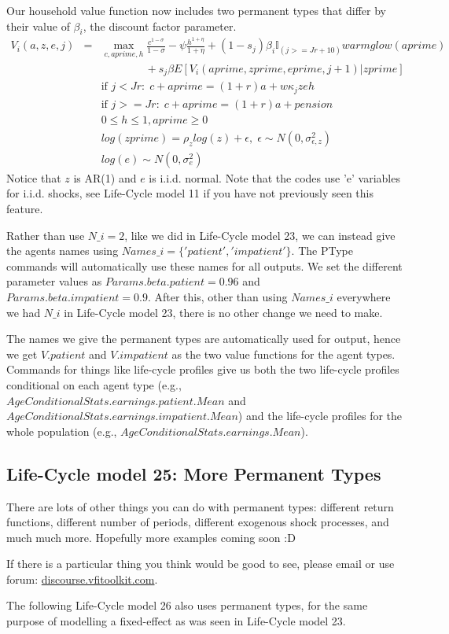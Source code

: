 Our household value function now includes two permanent types that differ by their value of $\beta_i$, the discount factor parameter.
\begin{eqnarray*}
 V_i(a,z,e,j)&=& \max_{c,aprime,h} \frac{c^{1-\sigma}}{1-\sigma} - \psi \frac{h^{1+\eta}}{1+\eta} + (1-s_j)\beta_i  \mathbb{I}_{(j>=Jr+10)} warmglow(aprime)     \\
 && \quad \quad  \quad \quad + s_j \beta E[V_i(aprime,zprime,eprime,j+1)|zprime] \\
&& \text{if }j<Jr: \; c+aprime=(1+r)a+w \kappa_j z e h \\
&& \text{if }j>=Jr: \; c+aprime=(1+r)a +pension\\
&& 0\leq h \leq 1, aprime\geq 0 \\
&& log(zprime)=\rho_{z} log(z) + \epsilon, \; \epsilon \sim N(0,\sigma_{\epsilon,z}^2) \\
&& log(e) \sim N(0,\sigma_{e}^2)
\end{eqnarray*}
Notice that $z$ is AR(1) and $e$ is i.i.d. normal. Note that the codes use 'e' variables for i.i.d. shocks, see Life-Cycle model 11 if you have not previously seen this feature.

Rather than use $N\_{}i=2$, like we did in Life-Cycle model 23, we can instead give the agents names using $Names\_{}i=\{'patient','impatient'\}$. The PType commands will automatically use these names for all outputs. We set the different parameter values as $Params.beta.patient=0.96$ and $Params.beta.impatient=0.9$. After this, other than using $Names\_{}i$ everywhere we had $N\_{}i$ in Life-Cycle model 23, there is no other change we need to make.

The names we give the permanent types are automatically used for output, hence we get $V.patient$ and $V.impatient$ as the two value functions for the agent types. Commands for things like life-cycle profiles give us both the two life-cycle profiles conditional on each agent type (e.g., $AgeConditionalStats.earnings.patient.Mean$ and $AgeConditionalStats.earnings.impatient.Mean$) and the life-cycle profiles for the whole population (e.g., $AgeConditionalStats.earnings.Mean$).



\subsection{Life-Cycle model 25: More Permanent Types}
There are lots of other things you can do with permanent types: different return functions, different number of periods, different exogenous shock processes, and much much more. Hopefully more examples coming soon :D

If there is a particular thing you think would be good to see, please email or use forum:  \href{http://discourse.vfitoolkit.com/}{discourse.vfitoolkit.com}.

The following Life-Cycle model 26 also uses permanent types, for the same purpose of modelling a fixed-effect as was seen in Life-Cycle model 23.



